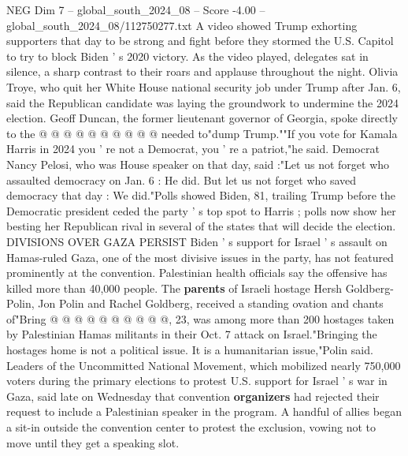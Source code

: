 \begin{textsample}{NEG Dim 7 – global\_south\_2024\_08 – Score -4.00 – global\_south\_2024\_08/112750277.txt}
A video showed Trump exhorting supporters that day to be strong and fight before they stormed the U.S.
Capitol to try to block Biden ' s 2020 victory.
As the video played, delegates sat in silence, a sharp contrast to their roars and applause throughout the night.
Olivia Troye, who quit her White House national security job under Trump after Jan. 6, said the Republican candidate was laying the groundwork to undermine the 2024 election.
Geoff Duncan, the former lieutenant governor of Georgia, spoke directly to the @ @ @ @ @ @ @ @ @ @ needed to"dump Trump.""If you vote for Kamala Harris in 2024 you ' re not a Democrat, you ' re a patriot,"he said.
Democrat Nancy Pelosi, who was House speaker on that day, said :"Let us not forget who assaulted democracy on Jan. 6 : He did.
But let us not forget who saved democracy that day : We did."Polls showed Biden, 81, trailing Trump before the Democratic president ceded the party ' s top spot to Harris ; polls now show her besting her Republican rival in several of the states that will decide the election.
DIVISIONS OVER GAZA PERSIST Biden ' s support for Israel ' s assault on Hamas-ruled Gaza, one of the most divisive issues in the party, has not featured prominently at the convention.
Palestinian health officials say the offensive has killed more than 40,000 people.
The \textbf{parents} of Israeli hostage Hersh Goldberg-Polin, Jon Polin and Rachel Goldberg, received a standing ovation and chants of"Bring @ @ @ @ @ @ @ @ @ @, 23, was among more than 200 hostages taken by Palestinian Hamas militants in their Oct. 7 attack on Israel."Bringing the hostages home is not a political issue.
It is a humanitarian issue,"Polin said.
Leaders of the Uncommitted National Movement, which mobilized nearly 750,000 voters during the primary elections to protest U.S. support for Israel ' s war in Gaza, said late on Wednesday that convention \textbf{organizers} had rejected their request to include a Palestinian speaker in the program.
A handful of allies began a sit-in outside the convention center to protest the exclusion, vowing not to move until they get a speaking slot.

\end{textsample}
